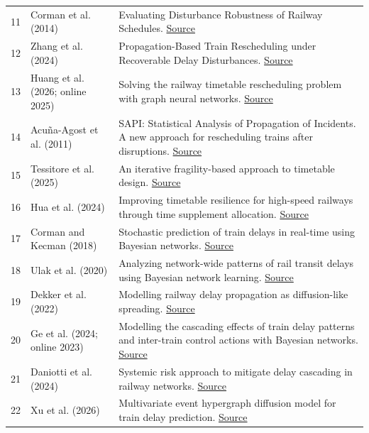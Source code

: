 \begin{longtable}{@{}p{.04\linewidth}>{\raggedright\arraybackslash}p{.20\linewidth}>{\raggedright\arraybackslash}p{.68\linewidth}@{}}
11 & Corman et al. (2014) & Evaluating Disturbance Robustness of Railway Schedules. \href{https://doi.org/10.1080/15472450.2013.801714}{Source} \\
12 & Zhang et al. (2024) & Propagation-Based Train Rescheduling under Recoverable Delay Disturbances. \href{https://doi.org/10.1155/2024/9961840}{Source} \\
13 & Huang et al. (2026; online 2025) & Solving the railway timetable rescheduling problem with graph neural networks. \href{https://doi.org/10.1007/s40534-025-00383-7}{Source} \\
14 & Acuña-Agost et al. (2011) & SAPI: Statistical Analysis of Propagation of Incidents. A new approach for rescheduling trains after disruptions. \href{https://doi.org/10.1016/j.ejor.2011.05.047}{Source} \\
15 & Tessitore et al. (2025) & An iterative fragility-based approach to timetable design. \href{https://doi.org/10.1016/j.jrtpm.2025.100554}{Source} \\
16 & Hua et al. (2024) & Improving timetable resilience for high-speed railways through time supplement allocation. \href{https://doi.org/10.11860/j.issn.1673-0291.20230073}{Source} \\
17 & Corman and Kecman (2018) & Stochastic prediction of train delays in real-time using Bayesian networks. \href{https://doi.org/10.1016/j.trc.2018.08.003}{Source} \\
18 & Ulak et al. (2020) & Analyzing network-wide patterns of rail transit delays using Bayesian network learning. \href{https://doi.org/10.1016/j.trc.2020.102749}{Source} \\
19 & Dekker et al. (2022) & Modelling railway delay propagation as diffusion-like spreading. \href{https://doi.org/10.1140/epjds/s13688-022-00359-1}{Source} \\
20 & Ge et al. (2024; online 2023) & Modelling the cascading effects of train delay patterns and inter-train control actions with Bayesian networks. \href{https://doi.org/10.1080/23248378.2023.2194304}{Source} \\
21 & Daniotti et al. (2024) & Systemic risk approach to mitigate delay cascading in railway networks. \href{https://doi.org/10.1038/s44333-024-00012-6}{Source} \\
22 & Xu et al. (2026) & Multivariate event hypergraph diffusion model for train delay prediction. \href{https://doi.org/10.1016/j.trc.2025.105390}{Source} \\
\end{longtable}
\endgroup
